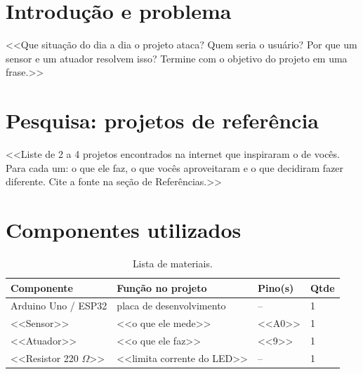 \documentclass[12pt,a4paper]{article}
\begin{document}
\begin{center}
\end{center}

\tableofcontents
\newpage

\section{Introdução e problema}
<<Que situação do dia a dia o projeto ataca? Quem seria o usuário? Por que um sensor e um
atuador resolvem isso? Termine com o objetivo do projeto em uma frase.>>

\section{Pesquisa: projetos de referência}
<<Liste de 2 a 4 projetos encontrados na internet que inspiraram o de vocês. Para cada um:
o que ele faz, o que vocês aproveitaram e o que decidiram fazer diferente. Cite a fonte
na seção de Referências.>>

\section{Componentes utilizados}
\begin{table}[H]
  \centering
  \begin{tabular}{llll}
    \toprule
    \textbf{Componente} & \textbf{Função no projeto} & \textbf{Pino(s)} & \textbf{Qtde} \\
    \midrule
    Arduino Uno / ESP32     & placa de desenvolvimento & --      & 1 \\
    <<Sensor>>              & <<o que ele mede>>       & <<A0>>  & 1 \\
    <<Atuador>>             & <<o que ele faz>>        & <<9>>   & 1 \\
    <<Resistor 220 $\Omega$>> & <<limita corrente do LED>> & --  & 1 \\
    \bottomrule
  \end{tabular}
  \caption{Lista de materiais.}
\end{table}
\end{document}
